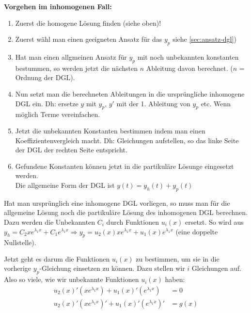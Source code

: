 \textbf{\textbf{Vorgehen im inhomogenen Fall:}}
\begin{enumerate}
	\item Zuerst die homogene Lösung finden (siehe oben)!

	\item Zuerst wähl man einen geeigneten Ansatz für das $y_p$ siehe \ref{sec:ansatz-dgl})

	\item Hat man einen allgmeinen Ansatz für $y_p$ mit noch unbekannten konstanten bestummen, so werden jetzt die nächsten $n$ Ableitung davon berechnet. ($n$ = Ordnung der DGL). 

	\item Nun setzt man die berechneten Ableitungen in die ursprüngliche inhomogene DGL ein. Dh: ersetze $y$ mit $y_p$, $y'$ mit der 1. Ableitung von $y_p$ etc. Wenn möglich Terme vereinfachen.

	\item Jetzt die unbekannten Konstanten bestimmen indem man einen Koeffizientenvergleich macht. Dh: Gleichungen aufstellen, so das linke Seite der DGL der rechten Seite entspricht. 

	\item Gefundene Konstanten können jetzt in die partikuläre Lösunge eingesetzt werden.\\
	Die allgemeine Form der DGL ist $y(t) = y_h(t) + y_p(t)$
\end{enumerate}

Hat man ursprünglich eine inhomogene DGL vorliegen, so muss man für die allgemeine Lösung
noch die partikuläre Lösung des inhomogenen DGL berechnen. Dazu werden die Unbekannten
$C_i$ durch Funktionen $u_i(x)$ ersetzt. So wird aus
$y_h = C_2 x e^{\lambda_1 x} + C_1 e^{\lambda_1 x} \Rightarrow
y_p = u_2(x) x e^{\lambda_1 x} + u_1(x) e^{\lambda_1 x}$ (eine doppelte Nullstelle).

Jetzt geht es darum die Funktionen $u_i(x)$ zu bestimmen, um sie in die vorherige
$y_p$-Gleichung einsetzen zu können. Dazu stellen wir $i$ Gleichungen auf.
Also so viele, wie wir unbekannte Funktionen $u_i(x)$ haben:
\begin{align*}
u_2(x)' (x e^{\lambda_1 x}) + u_1(x)' (e^{\lambda_1 x}) &= 0\\
u_2(x)' (x e^{\lambda_1 x})' + u_1(x)' (e^{\lambda_1 x})' &= g(x)
\end{align*}

